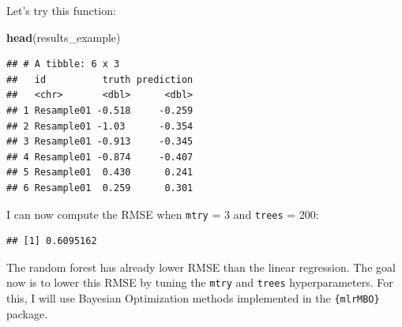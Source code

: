 \documentclass[]{gitbook}
\newenvironment{Shaded}{\begin{snugshade}}{\end{snugshade}}
\newcommand{\DataTypeTok}[1]{\textcolor[rgb]{0.13,0.29,0.53}{#1}}
\newcommand{\DecValTok}[1]{\textcolor[rgb]{0.00,0.00,0.81}{#1}}
\newcommand{\KeywordTok}[1]{\textcolor[rgb]{0.13,0.29,0.53}{\textbf{#1}}}
\newcommand{\NormalTok}[1]{#1}
\newcommand{\OperatorTok}[1]{\textcolor[rgb]{0.81,0.36,0.00}{\textbf{#1}}}
\newcommand{\StringTok}[1]{\textcolor[rgb]{0.31,0.60,0.02}{#1}}
\theoremstyle{definition}
\theoremstyle{definition}
\theoremstyle{definition}
\theoremstyle{remark}
\begin{document}
Let's try this function:

\begin{Shaded}
\end{Shaded}

\begin{Shaded}
\begin{Highlighting}[]
\KeywordTok{head}\NormalTok{(results_example)}
\end{Highlighting}
\end{Shaded}

\begin{verbatim}
## # A tibble: 6 x 3
##   id          truth prediction
##   <chr>       <dbl>      <dbl>
## 1 Resample01 -0.518     -0.259
## 2 Resample01 -1.03      -0.354
## 3 Resample01 -0.913     -0.345
## 4 Resample01 -0.874     -0.407
## 5 Resample01  0.430      0.241
## 6 Resample01  0.259      0.301
\end{verbatim}

I can now compute the RMSE when \texttt{mtry} = 3 and \texttt{trees} =
200:

\begin{Shaded}
\end{Shaded}

\begin{verbatim}
## [1] 0.6095162
\end{verbatim}

The random forest has already lower RMSE than the linear regression. The
goal now is to lower this RMSE by tuning the \texttt{mtry} and
\texttt{trees} hyperparameters. For this, I will use Bayesian
Optimization methods implemented in the \texttt{\{mlrMBO\}} package.
\end{document}
